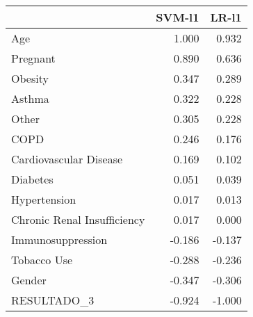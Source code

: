 \begin{tabular}{lrr}
\toprule
{} &  SVM-l1 &  LR-l1 \\
\midrule
Age                         &   1.000 &  0.932 \\
Pregnant                    &   0.890 &  0.636 \\
Obesity                     &   0.347 &  0.289 \\
Asthma                      &   0.322 &  0.228 \\
Other                       &   0.305 &  0.228 \\
COPD                        &   0.246 &  0.176 \\
Cardiovascular Disease      &   0.169 &  0.102 \\
Diabetes                    &   0.051 &  0.039 \\
Hypertension                &   0.017 &  0.013 \\
Chronic Renal Insufficiency &   0.017 &  0.000 \\
Immunosuppression           &  -0.186 & -0.137 \\
Tobacco Use                 &  -0.288 & -0.236 \\
Gender                      &  -0.347 & -0.306 \\
RESULTADO\_3                 &  -0.924 & -1.000 \\
\bottomrule
\end{tabular}
